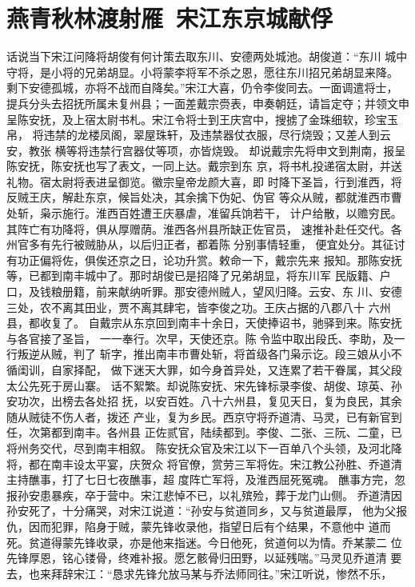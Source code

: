 \chapter{燕青秋林渡射雁~宋江东京城献俘}

话说当下宋江问降将胡俊有何计策去取东川、安德两处城池。胡俊道：“东川
城中守将，是小将的兄弟胡显。小将蒙李将军不杀之恩，愿往东川招兄弟胡显来降。
剩下安德孤城，亦将不战而自降矣。”宋江大喜，仍令李俊同去。一面调遣将士，
提兵分头去招抚所属未复州县；一面差戴宗赍表，申奏朝廷，请旨定夺；并领文申
呈陈安抚，及上宿太尉书札。宋江令将士到王庆宫中，搜掳了金珠细软，珍宝玉帛，
将违禁的龙楼凤阁，翠屋珠轩，及违禁器仗衣服，尽行烧毁；又差人到云安，教张
横等将违禁行宫器仗等项，亦皆烧毁。
却说戴宗先将申文到荆南，报呈陈安抚，陈安抚也写了表文，一同上达。戴宗到东
京，将书札投递宿太尉，并送礼物。宿太尉将表进呈御览。徽宗皇帝龙颜大喜，即
时降下圣旨，行到淮西，将反贼王庆，解赴东京，候旨处决，其余擒下伪妃、伪官
等众从贼，都就淮西市曹处斩，枭示施行。淮西百姓遭王庆暴虐，准留兵饷若干，
计户给散，以赡穷民。其阵亡有功降将，俱从厚赠荫。淮西各州县所缺正佐官员，
速推补赴任交代。各州官多有先行被贼胁从，以后归正者，都着陈分别事情轻重，
便宜处分。其征讨有功正偏将佐，俱俟还京之日，论功升赏。敕命一下，戴宗先来
报知。那陈安抚等，已都到南丰城中了。那时胡俊已是招降了兄弟胡显，将东川军
民版籍、户口，及钱粮册籍，前来献纳听罪。那安德州贼人，望风归降。云安、东
川、安德三处，农不离其田业，贾不离其肆宅，皆李俊之功。王庆占据的八郡八十
六州县，都收复了。
自戴宗从东京回到南丰十余日，天使捧诏书，驰驿到来。陈安抚与各官接了圣旨，
一一奉行。次早，天使还京。陈令监中取出段氏、李助，及一行叛逆从贼，判了
斩字，推出南丰市曹处斩，将首级各门枭示讫。段三娘从小不循闺训，自家择配，
做下迷天大罪，如今身首异处，又连累了若干眷属，其父段太公先死于房山寨。
话不絮繁。却说陈安抚、宋先锋标录李俊、胡俊、琼英、孙安功次，出榜去各处招
抚，以安百姓。八十六州县，复见天日，复为良民，其余随从贼徒不伤人者，拨还
产业，复为乡民。西京守将乔道清、马灵，已有新官到任，次第都到南丰。各州县
正佐贰官，陆续都到。李俊、二张、三阮、二童，已将州务交代，尽到南丰相叙。
陈安抚众官及宋江以下一百单八个头领，及河北降将，都在南丰设太平宴，庆贺众
将官僚，赏劳三军将佐。宋江教公孙胜、乔道清主持醮事，打了七日七夜醮事，超
度阵亡军将，及淮西屈死冤魂。
醮事方完，忽报孙安患暴疾，卒于营中。宋江悲悼不已，以礼殡殓，葬于龙门山侧。
乔道清因孙安死了，十分痛哭，对宋江说道：“孙安与贫道同乡，又与贫道最厚，
他为父报仇，因而犯罪，陷身于贼，蒙先锋收录他，指望日后有个结果，不意他中
道而死。贫道得蒙先锋收录，亦是他来指迷。今日他死，贫道何以为情。乔某蒙二
位先锋厚恩，铭心镂骨，终难补报。愿乞骸骨归田野，以延残喘。”马灵见乔道清
要去，也来拜辞宋江：“恳求先锋允放马某与乔法师同往。”宋江听说，惨然不乐，
